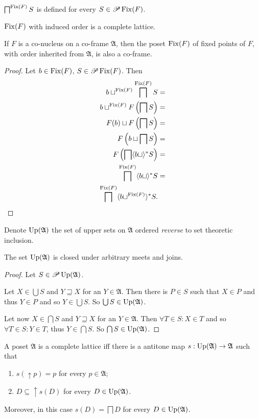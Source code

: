 \begin{cor}
$\bigsqcap^{\operatorname{Fix}(F)}S$ is defined for every $S\in\mathscr{P}\operatorname{Fix}(F)$.\end{cor}
\begin{obvious}
$\operatorname{Fix}(F)$ with induced order is a complete lattice.\end{obvious}
\begin{lem}
\label{fix-is-co-frame}If $F$ is a co-nucleus on a co-frame $\mathfrak{A}$,
then the poset $\operatorname{Fix}(F)$ of fixed points of $F$, with order inherited
from $\mathfrak{A}$, is also a co-frame.\end{lem}
\begin{proof}
Let $b\in\operatorname{Fix}(F)$, $S\in\mathscr{P}\operatorname{Fix}(F)$. Then 
\begin{align*}
b\sqcup^{\operatorname{Fix}(F)}\bigsqcap^{\operatorname{Fix}(F)}S & =\\
b\sqcup^{\operatorname{Fix}(F)}F\left(\bigsqcap S\right) & =\\
F(b)\sqcup F\left(\bigsqcap S\right) & =\\
F\left(b\sqcup\bigsqcap S\right) & =\\
F\left(\bigsqcap\langle b\sqcup\rangle^{\ast}S\right) & =\\
\bigsqcap^{\operatorname{Fix}(F)}\langle b\sqcup\rangle^{\ast}S & =\\
\bigsqcap^{\operatorname{Fix}(F)}\langle b\sqcup^{\operatorname{Fix}(F)}\rangle^{\ast}S.
\end{align*}
\end{proof}
\begin{defn}
Denote $\operatorname{Up}(\mathfrak{A})$ the set of upper sets on $\mathfrak{A}$
ordered \emph{reverse} to set theoretic inclusion.\end{defn}
\begin{lem}
The set $\operatorname{Up}(\mathfrak{A})$ is closed under arbitrary meets and
joins.\end{lem}
\begin{proof}
Let $S\in\mathscr{P}\operatorname{Up}(\mathfrak{A})$.

Let $X\in\bigcup S$ and $Y\sqsupseteq X$ for an $Y\in\mathfrak{A}$.
Then there is $P\in S$ such that $X\in P$ and thus $Y\in P$ and
so $Y\in\bigcup S$. So $\bigcup S\in\operatorname{Up}(\mathfrak{A})$.

Let now $X\in\bigcap S$ and $Y\sqsupseteq X$ for an $Y\in\mathfrak{A}$.
Then $\forall T\in S:X\in T$ and so $\forall T\in S:Y\in T$, thus
$Y\in\bigcap S$. So $\bigcap S\in\operatorname{Up}(\mathfrak{A})$.\end{proof}
\begin{thm}
\label{compl-via-down}A poset $\mathfrak{A}$ is a complete lattice
iff there is a antitone map $s:\operatorname{Up}(\mathfrak{A})\rightarrow\mathfrak{A}$
such that
\begin{enumerate}
\item $s(\uparrow p)=p$ for every $p\in\mathfrak{A}$;
\item $D\subseteq\uparrow s(D)$ for every $D\in\operatorname{Up}(\mathfrak{A})$.
\end{enumerate}
Moreover, in this case $s(D)=\bigsqcap D$ for every $D\in\operatorname{Up}(\mathfrak{A})$.\end{thm}
